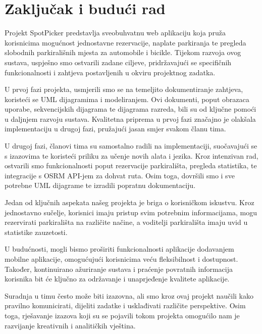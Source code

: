 \chapter{Zaključak i budući rad}
{Projekt SpotPicker predstavlja sveobuhvatnu web aplikaciju koja pruža korisnicima mogućnost jednostavne rezervacije, naplate parkiranja te pregleda slobodnih parkirališnih mjesta za automobile i bicikle. Tijekom razvoja ovog sustava, uspješno smo ostvarili zadane ciljeve, pridržavajući se specifičnih funkcionalnosti i zahtjeva postavljenih u okviru projektnog zadatka.
	
U prvoj fazi projekta, usmjerili smo se na temeljito dokumentiranje zahtjeva, koristeći se UML dijagramima i modeliranjem. Ovi dokumenti, poput obrazaca uporabe, sekvencijskih dijagrama te dijagrama razreda, bili su od ključne pomoći u daljnjem razvoju sustava. Kvalitetna priprema u prvoj fazi značajno je olakšala implementaciju u drugoj fazi, pružajući jasan smjer svakom  članu tima.
	
U drugoj fazi, članovi tima su samostalno radili na implementaciji, suočavajući se s izazovima te koristeći priliku za učenje novih alata i jezika. Kroz intenzivan rad, ostvarili smo funkcionalnosti poput rezervacije parkirališta, pregleda statistika, te integracije s OSRM API-jem za dohvat ruta. Osim toga, dovršili smo i sve potrebne UML dijagrame te izradili popratnu dokumentaciju.
	
Jedan od ključnih aspekata našeg projekta je briga o korisničkom iskustvu. Kroz jednostavno sučelje, korisnici imaju pristup svim potrebnim informacijama, mogu rezervirati parkirališta na različite načine, a voditelji parkirališta imaju uvid u statistike zauzetosti.
	
U budućnosti, mogli bismo proširiti funkcionalnosti aplikacije dodavanjem mobilne aplikacije, omogućujući korisnicima veću fleksibilnost i dostupnost. Također, kontinuirano ažuriranje sustava i praćenje povratnih informacija korisnika bit će ključno za održavanje i unaprjeđenje kvalitete aplikacije.
	
Suradnja u timu često može biti izazovna, ali smo kroz ovaj projekt naučili kako pravilno komunicirati, dijeliti zadatke i usklađivati različite perspektive. Osim toga, rješavanje izazova koji su se pojavili tokom projekta omogućilo nam je razvijanje kreativnih i analitičkih vještina.}